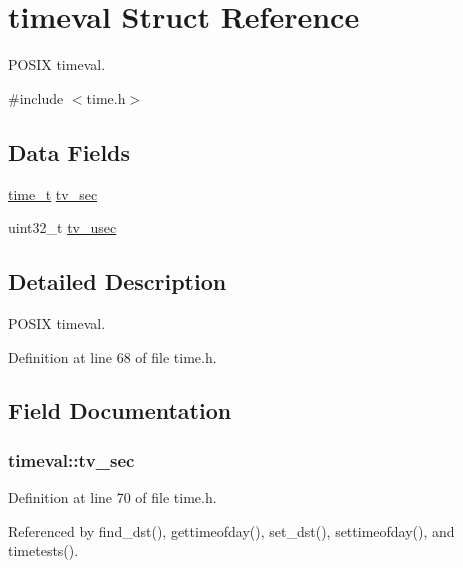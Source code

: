 \hypertarget{structtimeval}{}\section{timeval Struct Reference}
\label{structtimeval}


P\+O\+S\+IX timeval.  




{\ttfamily \#include $<$time.\+h$>$}

\subsection*{Data Fields}
\begin{DoxyCompactItemize}
\item 
\hyperlink{time_8h_a3346b04b0420b32ccf6b706551b70762}{time\+\_\+t} \hyperlink{structtimeval_aef6ddab1064c430758f9f913b7e4a21e}{tv\+\_\+sec}
\item 
uint32\+\_\+t \hyperlink{structtimeval_a8fd7abf5420981b3ff58bb23df458587}{tv\+\_\+usec}
\end{DoxyCompactItemize}


\subsection{Detailed Description}
P\+O\+S\+IX timeval. 

Definition at line 68 of file time.\+h.



\subsection{Field Documentation}
\subsubsection[{\texorpdfstring{tv\+\_\+sec}{tv_sec}}]{ timeval\+::tv\+\_\+sec}\hypertarget{structtimeval_aef6ddab1064c430758f9f913b7e4a21e}{}\label{structtimeval_aef6ddab1064c430758f9f913b7e4a21e}


Definition at line 70 of file time.\+h.



Referenced by find\+\_\+dst(), gettimeofday(), set\+\_\+dst(), settimeofday(), and timetests().

